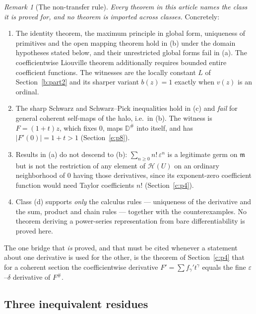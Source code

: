 \documentclass[11pt,a4paper]{article}
\numberwithin{equation}{section}
\theoremstyle{definition}
\theoremstyle{remark}
\newtheorem{remark}[theorem]{Remark}
\theoremstyle{plain}
\newcommand{\mm}{\mathfrak m}
\newcommand{\tm}{t}
\newcommand{\halo}[1]{#1^{\#}}
\newcommand{\ev}[1]{#1^{\#}}
\newcommand{\Hc}{\mathcal H}
\newcommand{\abs}[1]{\lvert #1\rvert}
\begin{document}
\begin{remark}[The non-transfer rule]\label{a:rem:classtransfer}
\emph{Every theorem in this article names the class it is proved for,
and no theorem is imported across classes.}  Concretely:
\begin{enumerate}[label=\textup{(\roman*)},leftmargin=2.4em]
\item The identity theorem, the maximum principle in global form,
uniqueness of primitives and the open mapping theorem hold in (b)
under the domain hypotheses stated below, and their unrestricted global
forms fail in (a). The coefficientwise Liouville theorem additionally
requires bounded entire coefficient functions.  The witnesses are the
locally constant $L$ of Section~\ref{b:part2} and its sharper variant
$b(z)=1$ exactly when $v(z)$ is an ordinal.
\item The sharp Schwarz and Schwarz--Pick inequalities hold in (c) and
\emph{fail} for general coherent self-maps of the halo, i.e.\ in (b).
The witness is $F=(1+\tm)z$, which fixes $0$, maps $\halo{\mathbb D}$
into itself, and has $\abs{F'(0)}=1+\tm>1$ (Section~\ref{e:p8}).
\item Results in (a) do not descend to (b): $\sum_{n\ge0}n!\,
\varepsilon^{n}$ is a legitimate germ on $\mm$ but is not the
restriction of any element of $\Hc(U)$ on an ordinary neighborhood of
$0$ having those derivatives, since its exponent-zero coefficient
function would need Taylor coefficients $n!$ (Section~\ref{c:p4}).
\item Class (d) supports \emph{only} the calculus rules --- uniqueness
of the derivative and the sum, product and chain rules --- together with
the counterexamples. No theorem deriving a power-series representation
from bare differentiability is proved here.
\end{enumerate}
The one bridge that \emph{is} proved, and that must be cited whenever a
statement about one derivative is used for the other, is the theorem of
Section~\ref{c:p4} that for a coherent section the coefficientwise derivative
$F'=\sum f_\gamma'\tm^{\gamma}$ equals the fine
$\varepsilon$--$\delta$ derivative of $\ev F$.
\end{remark}

\subsection{Three inequivalent residues}\label{a:def:residues}
\end{document}
